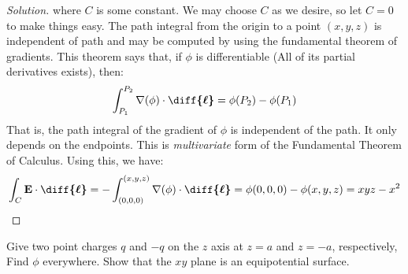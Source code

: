 \begin{proof}[Solution]
                where $C$ is some constant. We may choose $C$ as we desire,
                so let $C=0$ to make things easy. The path integral
                from the origin to a point $(x,y,z)$ is independent
                of path and may be computed by using the fundamental
                theorem of gradients. This theorem says that,
                if $\phi$ is differentiable
                (All of its partial derivatives exists), then:
                \begin{equation*}
                    \int_{P_{1}}^{P_{2}}
                    \nabla(\phi)\cdot\boldsymbol{\diff{\ell}}
                    =\phi(P_{2})-\phi(P_{1})
                \end{equation*}
                That is, the path integral of the gradient of
                $\phi$ is independent of the path. It only depends
                on the endpoints.
                This is \textit{multivariate} form of the
                Fundamental Theorem of Calculus. Using this, we have:
                \begin{align*}
                    \int_{C}\mathbf{E}\cdot\boldsymbol{\diff{\ell}}
                    =-\int _{(0,0,0)}^{(x,y,z)}
                    \nabla(\phi)\cdot\boldsymbol{\diff{\ell}}
                    =\phi(0,0,0)-\phi(x,y,z)
                    =xyz-x^2
                \end{align*}
            \end{proof}
            \begin{problem}[Wangsness 5-3]
                \label{problem:EMAG_Wangsness_5_3}
                Give two point charges $q$ and $-q$ on the
                $z$ axis at $z=a$ and $z=-a$, respectively,
                Find $\phi$ everywhere. Show that the
                $xy$ plane is an equipotential surface.
            \end{problem}

